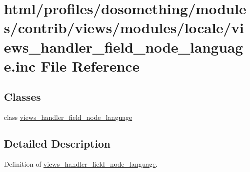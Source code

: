 \hypertarget{views__handler__field__node__language_8inc}{
\section{html/profiles/dosomething/modules/contrib/views/modules/locale/views\_\-handler\_\-field\_\-node\_\-language.inc File Reference}
\label{views__handler__field__node__language_8inc}
}
\subsection*{Classes}
\begin{DoxyCompactItemize}
\item 
class \hyperlink{classviews__handler__field__node__language}{views\_\-handler\_\-field\_\-node\_\-language}
\end{DoxyCompactItemize}


\subsection{Detailed Description}
Definition of \hyperlink{classviews__handler__field__node__language}{views\_\-handler\_\-field\_\-node\_\-language}. 